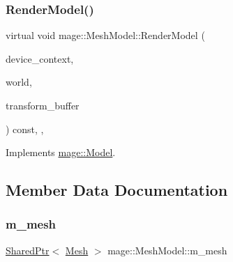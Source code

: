 \hypertarget{classmage_1_1_mesh_model_a3ea5bfb0599768712bbd2e46a7d2ff80}{}\label{classmage_1_1_mesh_model_a3ea5bfb0599768712bbd2e46a7d2ff80} 
\subsubsection{\texorpdfstring{Render\+Model()}{RenderModel()}}
{\footnotesize\ttfamily virtual void mage\+::\+Mesh\+Model\+::\+Render\+Model (\begin{DoxyParamCaption}\item[{I\+D3\+D11\+Device\+Context2 \&}]{device\+\_\+context,  }\item[{const \hyperlink{classmage_1_1_world}{World} \&}]{world,  }\item[{const \hyperlink{structmage_1_1_transform_buffer}{Transform\+Buffer} \&}]{transform\+\_\+buffer }\end{DoxyParamCaption}) const\hspace{0.3cm}{\ttfamily [override]}, {\ttfamily [protected]}, {\ttfamily [virtual]}}



Implements \hyperlink{classmage_1_1_model_a2e455bf2998946d776b4056568a1c816}{mage\+::\+Model}.



\subsection{Member Data Documentation}
\hypertarget{classmage_1_1_mesh_model_ad9d71a65feff8c14b7272891cd42cfd4}{}\label{classmage_1_1_mesh_model_ad9d71a65feff8c14b7272891cd42cfd4} 
\subsubsection{\texorpdfstring{m\+\_\+mesh}{m\_mesh}}
{\footnotesize\ttfamily \hyperlink{namespacemage_a1e01ae66713838a7a67d30e44c67703e}{Shared\+Ptr}$<$ \hyperlink{classmage_1_1_mesh}{Mesh} $>$ mage\+::\+Mesh\+Model\+::m\+\_\+mesh\hspace{0.3cm}{\ttfamily [private]}}

